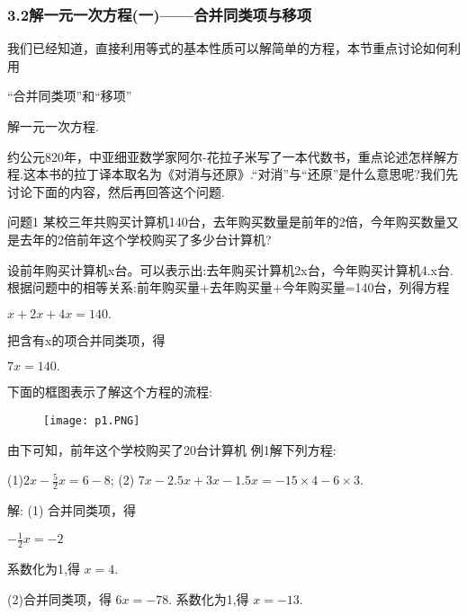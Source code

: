\documentclass{article}
\date{}
\begin{document}
\title{}
\maketitle
\subsubsection*{ 3.2解一元一次方程(一)——合并同类项与移项}

\begin{article}
    \indent 我们已经知道，直接利用等式的基本性质可以解简单的方程，本节重点讨论如何利用\begin{definition}“合并同类项”和“移项”\end{definition}解一元一次方程.
    
    \indent 约公元820年，中亚细亚数学家阿尔-花拉子米写了一本代数书，重点论述怎样解方程.这本书的拉丁译本取名为《对消与还原》.“对消”与“还原”是什么意思呢?我们先讨论下面的内容，然后再回答这个问题.
    
    \begin{example}
    \indent  问题1 某校三年共购买计算机140台，去年购买数量是前年的2倍，今年购买数量又是去年的2倍前年这个学校购买了多少台计算机?
    
    \indent 设前年购买计算机x台。可以表示出:去年购买计算机2x台，今年购买计算机4.x台.根据问题中的相等关系:前年购买量+去年购买量+今年购买量=140台，列得方程
    \begin{center}$x+2x+4x=140.$\end{center}
    
    \indent 把含有x的项合并同类项，得
    \begin{center}$7x= 140.$\end{center}

     \indent 下面的框图表示了解这个方程的流程:
     \begin{figure}
         \centering
         \texttt{[image: p1.PNG]}
     \end{figure}
     
     \indent 由下可知，前年这个学校购买了20台计算机
     \newpage 
      例1解下列方程:      
     
      (1)$ 2x-\frac{5}{2}x=6-8$;  (2) $7x-2.5x+3x-1.5x=-15\times4-6\times3$.
      
      解: (1) 合并同类项，得  
      
      $-\frac{1}{2}x=-2$
      
      系数化为1,得      
      $x=4$.
      
      (2)合并同类项，得     
     $6x=-78$.
      系数化为1,得      
      $x=-13$. 
      

\end{example}
\end{article}
\end{document}
